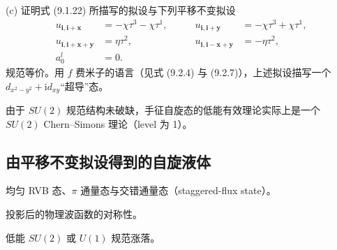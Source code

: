 (c) 证明式 (9.1.22) 所描写的拟设与下列平移不变拟设
\begin{equation*}
\begin{aligned}
u_{\pmb{i},\pmb{i}+\pmb{x}} &= -\chi\tau^{3}-\chi\tau^{1}, &\qquad u_{\pmb{i},\pmb{i}+\pmb{y}} &= -\chi\tau^{3}+\chi\tau^{1},\\
u_{\pmb{i},\pmb{i}+\pmb{x}+\pmb{y}} &= \eta\tau^{2}, &\qquad u_{\pmb{i},\pmb{i}-\pmb{x}+\pmb{y}} &= -\eta\tau^{2},\\
a_0^{l} &= 0. &&
\end{aligned}
\end{equation*}
规范等价。用 $f$ 费米子的语言（见式 (9.2.4) 与 (9.2.7)），上述拟设描写一个 $d_{x^{2}-y^{2}}+\mathrm{i}d_{xy}$“超导”态。

由于 $SU(2)$ 规范结构未破缺，手征自旋态的低能有效理论实际上是一个 $SU(2)$ Chern--Simons 理论（level 为 1）。

\subsection{由平移不变拟设得到的自旋液体}

\begin{keypoints}
\item 均匀 RVB 态、$\pi$ 通量态与交错通量态（staggered-flux state）。
\item 投影后的物理波函数的对称性。
\item 低能 $SU(2)$ 或 $U(1)$ 规范涨落。
\end{keypoints}

